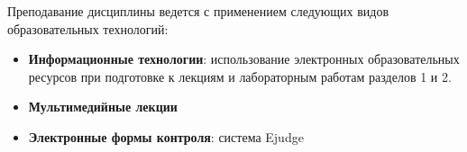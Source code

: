 {\parindent0pt
Преподавание дисциплины ведется с применением следующих видов образовательных технологий:\\
\begin{itemize}
	\item \textbf{Информационные технологии}: использование электронных образовательных ресурсов при подготовке к лекциям и лабораторным работам разделов 1 и 2.
	\item \textbf{Мультимедийные лекции}
	\item \textbf{Электронные формы контроля}: система Ejudge
\end{itemize}

}



